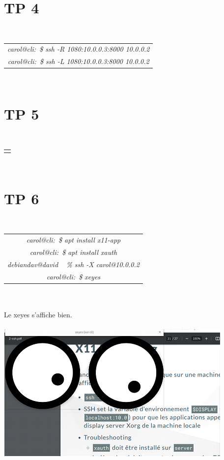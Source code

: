 \documentclass{report}
\begin{document}
\section{TP 4}
\\
\begin{tabular}{|c|}
\hline
\textit{carol@cli:~\$ ssh -R 1080:10.0.0.3:8000 10.0.0.2}\\
\textit{carol@cli:~\$ ssh -L 1080:10.0.0.3:8000 10.0.0.2}\\
\hline
\end{tabular}
\\
\section{TP 5}
\\
\begin{tabular}{|c|}
\hline
\textit{}\\
\end{tabular}
\\
\section{TP 6}
\\
\begin{tabular}{|c|}
\hline
\textit{carol@cli:~\$ apt install x11-app}\\
\textit{carol@cli:~\$ apt install xauth}\\
\textit{debiandav@david ~ \% ssh -X carol@10.0.0.2}\\
\textit{carol@cli:~\$ xeyes}\\
\hline
\end{tabular}
\\
\\
Le xeyes s'affiche bien. 
\\
\\
\includegraphics{xeyes}
\\
\\
\end{document}
